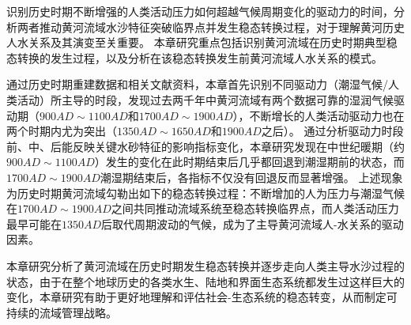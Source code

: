 识别历史时期不断增强的人类活动压力如何超越气候周期变化的驱动力的时间，分析两者推动黄河流域水沙特征突破临界点并发生稳态转换过程，对于理解黄河历史人水关系及其演变至关重要。
本章研究重点包括识别黄河流域在历史时期典型稳态转换的发生过程，以及分析在该稳态转换发生前黄河流域人水关系的模式。

通过历史时期重建数据和相关文献资料，本章首先识别不同驱动力（潮湿气候/人类活动）所主导的时段，发现过去两千年中黄河流域有两个数据可靠的湿润气候驱动期（$900AD\sim1100AD$和$1700AD\sim1900AD$），不断增长的人类活动驱动力也在两个时期内尤为突出（$1350AD \sim 1650AD$和$1900AD$之后）。
通过分析驱动力时段前、中、后能反映关键水砂特征的影响指标变化，本章研究发现在中世纪暖期（约$900AD \sim 1100AD$）发生的变化在此时期结束后几乎都回退到潮湿期前的状态，而$1700AD \sim 1900AD$潮湿期结束后，各指标不仅没有回退反而显著增强。
上述现象为历史时期黄河流域勾勒出如下的稳态转换过程：不断增加的人为压力与潮湿气候在$1700AD \sim 1900AD$之间共同推动流域系统至稳态转换临界点，而人类活动压力最早可能在$1350AD$后取代周期波动的气候，成为了主导黄河流域人-水关系的驱动因素。

本章研究分析了黄河流域在历史时期发生稳态转换并逐步走向人类主导水沙过程的状态，由于在整个地球历史的各类水生、陆地和界面生态系统都发生过这样巨大的变化，本章研究有助于更好地理解和评估社会-生态系统的稳态转变，从而制定可持续的流域管理战略。
